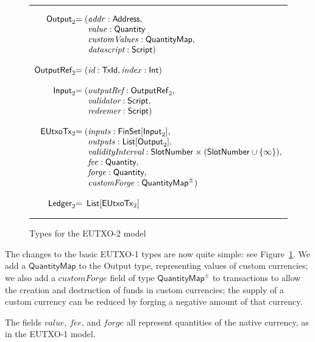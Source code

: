 \documentclass[a4paper]{article}
\renewcommand{\i}{\textit}  %
\newcommand{\s}{\textsf}  %
\newenvironment{arraydefs}[1]{\setlength{\arraycolsep}{0pt}\begin{array}{#1}}{\end{array}}
\newcommand\rfskip{7pt}
\newenvironment{ruledfigure}[1]{\begin{figure}[#1]\hrule\vspace{\rfskip}}{\vspace{\rfskip}\hrule\end{figure}}
\newcommand{\List}[1]{\ensuremath{\s{List}[#1]}}
\newcommand{\FinSet}[1]{\ensuremath{\s{FinSet}[#1]}}
\newcommand{\mi}[1]{\ensuremath{\mathit{#1}}}
\newcommand{\idx}{\mi{index}}
\newcommand{\inputs}{\mi{inputs}}
\newcommand{\outputs}{\mi{outputs}}
\newcommand{\forge}{\mi{forge}}
\newcommand{\fee}{\mi{fee}}
\newcommand{\addr}{\mi{addr}}
\newcommand{\val}{\mi{value}}  %
\newcommand{\customvals}{\mi{customValues}}
\newcommand{\customforge}{\mi{customForge}}
\newcommand{\msf}[1]{\ensuremath{\mathsf{#1}}}
\newcommand{\slotnum}{\msf{SlotNumber}}
\newcommand{\eutxotx}{\msf{EUtxoTx}}
\newcommand{\qty}{\ensuremath{\s{Quantity}}}
\newcommand{\qtymap}{\ensuremath{\s{QuantityMap}}}
\begin{document}
\begin{ruledfigure}{H}
  \[
  \begin{arraydefs}{rll}
    \s{Output}_2 &= (&\addr: \s{Address},\\
    && \val: \qty\\
    && \customvals: \qtymap,\\
    && \i{datascript}: \s{Script})\\
    \\
    \s{OutputRef}_2 &= (&\i{id}: \s{TxId}, \idx: \s{Int})\\
    \\
    \s{Input}_2 &= (& \i{outputRef}: \sf{OutputRef}_2,\\
                     && \i{validator}: \s{Script},\\
                     & & \i{redeemer}: \s{Script})\\
\\
    \eutxotx_2 &= ( &\inputs: \FinSet{\s{Input}_2},\\
    &&\outputs: \List{\s{Output}_2},\\
    &&\i{validityInterval}: \slotnum \times (\slotnum \cup \{\infty\}),\\
    &&\fee: \qty,\\
    &&\forge: \qty,\\
    &&\customforge: \qtymap^{\pm})\\
    \\
    \s{Ledger}_2 &=&\!\List{\eutxotx_2}\\
\end{arraydefs}
  \]
  \caption{Types for the EUTXO-2 model}
  \label{fig:eutxo-2-types}
\end{ruledfigure}

\noindent The changes to the basic EUTXO-1 types are now quite simple:
see Figure~\ref{fig:eutxo-2-types}.  We add a \qtymap{} to the
\s{Output} type, representing values of custom currencies; we also add
a \customforge{} field of type $\qtymap^{\pm}$ to transactions to
allow the creation and destruction of funds in custom currencies; the
supply of a custom currency can be reduced by forging a negative
amount of that currency.

The fields \val, \fee, and \forge{} all represent quantities of the
native currency, as in the EUTXO-1 model.
\end{document}
